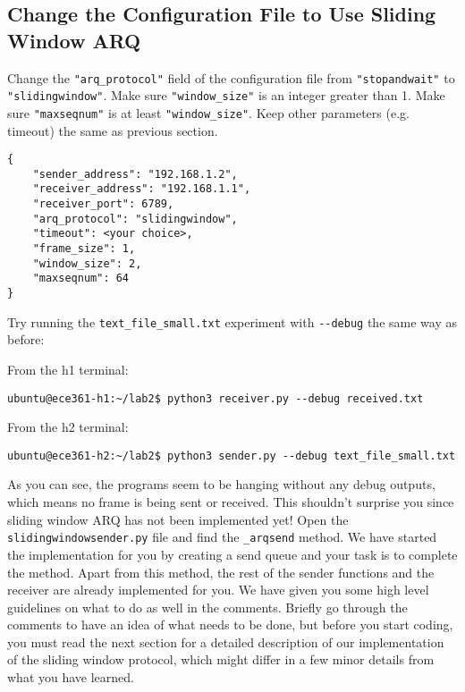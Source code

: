 \documentclass[11pt]{article}
\begin{document}
\subsection{Change the Configuration File to Use Sliding Window ARQ}
Change the \texttt{"arq\_protocol"} field of the configuration file from \texttt{"stopandwait"} to \texttt{"slidingwindow"}.
Make sure \texttt{"window\_size"} is an integer greater than 1.
Make sure \texttt{"maxseqnum"} is at least \texttt{"window\_size"}.
Keep other parameters (e.g. timeout) the same as previous section.
\begin{lstlisting}[style=ece361-shell-base, caption={Sliding Window Configuration}]
{
    "sender_address": "192.168.1.2",
    "receiver_address": "192.168.1.1",
    "receiver_port": 6789,
    "arq_protocol": "slidingwindow",
    "timeout": <your choice>,
    "frame_size": 1,
    "window_size": 2,
    "maxseqnum": 64
}
\end{lstlisting}


Try running the \texttt{text\_file\_small.txt} experiment with \texttt{-{}-debug} the same way as before:

\noindent From the h1 terminal:
\begin{lstlisting}[style=ece361-shell-base, caption={}]
ubuntu@ece361-h1:~/lab2$ python3 receiver.py --debug received.txt
\end{lstlisting}

From the h2 terminal:
\begin{lstlisting}[style=ece361-shell-base, caption={}]
ubuntu@ece361-h2:~/lab2$ python3 sender.py --debug text_file_small.txt
\end{lstlisting}

As you can see, the programs seem to be hanging without any debug outputs, which means no frame is being sent or received.
This shouldn't surprise you since sliding window ARQ has not been implemented yet!
Open the \texttt{slidingwindowsender.py} file and find the \texttt{\_arqsend} method.
We have started the implementation for you by creating a send queue and your task is to complete the method.
Apart from this method, the rest of the sender functions and the receiver are already implemented for you.
We have given you some high level guidelines on what to do as well in the comments.
Briefly go through the comments to have an idea of what needs to be done, but before you start coding, you must read the next section for a detailed description of our implementation of the sliding window protocol, which might differ in a few minor details from what you have learned.
\end{document}

